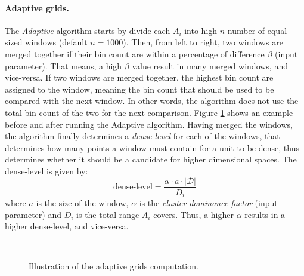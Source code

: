 \paragraph{Adaptive grids.}
The \textit{Adaptive} algorithm starts by divide each $A_i$ into high $n$-number of equal-sized windows (default $n = 1000$). Then, from left to right, two windows are merged together if their bin count are within a percentage of difference $\beta$ (input parameter). That means, a high $\beta$ value result in many merged windows, and vice-versa. If two windows are merged together, the highest bin count are assigned to the window, meaning the bin count that should be used to be compared with the next window. In other words, the algorithm does not use the total bin count of the two for the next comparison. Figure \ref{fig:adaptive_grids} shows an example before and after running the Adaptive algorithm. Having merged the windows, the algorithm finally determines a \textit{dense-level} for each of the windows, that determines how many points a window must contain for a unit to be dense, thus determines whether it should be a candidate for higher dimensional spaces. The dense-level is given by:
\begin{equation}
    \text{dense-level} = \frac{\alpha \cdot a\cdot |\mathcal{D}|}{D_i}
\end{equation}
where $a$ is the size of the window, $\alpha$ is the \textit{cluster dominance factor} (input parameter) and $D_i$ is the total range $A_i$ covers. Thus, a higher $\alpha$ results in a higher dense-level, and vice-versa.
\begin{figure}[H]
    \vspace*{-0.5cm}
    \centering
    ~~~~
    ~~~~
    \caption{Illustration of the adaptive grids computation.}
    \label{fig:adaptive_grids}
    \vspace*{-0.5cm}
\end{figure}

